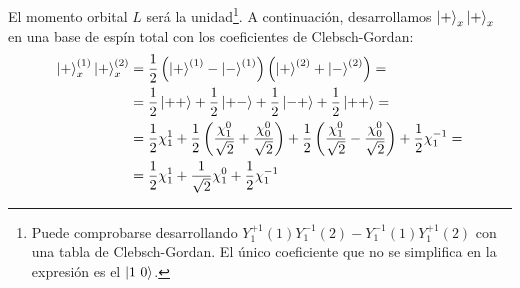 El momento orbital $L$ será la unidad\footnote{Puede comprobarse
  desarrollando $Y_1^{+1}(1)  Y_1^{-1}(2) - Y_1^{-1}(1)Y_1^{+1}(2)$
  con una tabla de Clebsch-Gordan. El único coeficiente que no se
  simplifica en la expresión es el $\ket{1\ 0}$.}. A continuación,
desarrollamos $\ket{+}_x\ket{+}_x$ en una base de espín total con los
coeficientes de Clebsch-Gordan:
\begin{equation}
  \begin{split}
    \ket{+}_x^{(1)}\ket{+}_x^{(2)} &= \frac{1}{2} \left( \ket{+}^{(1)} -
      \ket{-}^{(1)} \right)\left( \ket{+}^{(2)} + \ket{-}^{(2)}
    \right)= \\ &= \frac{1}{2}\ket{++} + \frac{1}{2}\ket{+-} +
    \frac{1}{2}\ket{-+}  + \frac{1}{2}\ket{++}  = \\
    &= \frac{1}{2} \chi_1^1 + \frac{1}{2} 
    \left( \frac{\chi_1^0}{\sqrt{2}} + \frac{\chi_0^0}{\sqrt{2}} \right)
    + \frac{1}{2}
    \left( \frac{\chi_1^0}{\sqrt{2}} - \frac{\chi_0^0}{\sqrt{2}} \right)
    + \frac{1}{2} \chi_1^{-1} = \\
    &= \frac{1}{2} \chi_1^1 + \frac{1}{\sqrt{2}} \chi_1^0 +
    \frac{1}{2} \chi_1^{-1}
  \end{split}
\end{equation}

